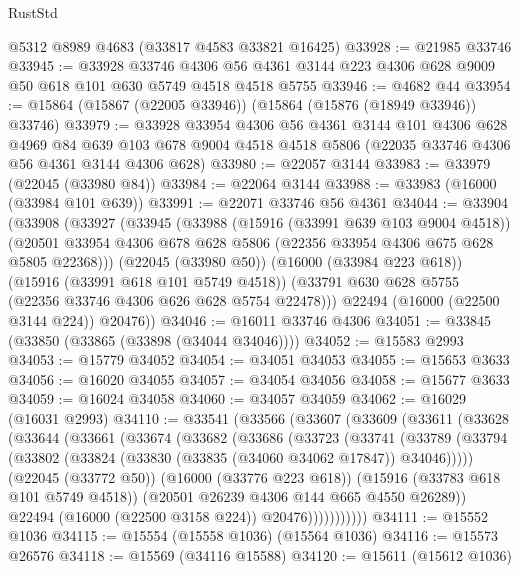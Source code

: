 \begin{lexlean}{RustStd}
\begin{coremodule}
    @5312
    @8989
    @4683
    (@33817 @4583 @33821 @16425)
@33928 := @21985 @33746
@33945 := @33928
    @33746
    @4306
    @56
    @4361
    @3144
    @223
    @4306
    @628
    @9009
    @50
    @618
    @101
    @630
    @5749
    @4518
    @4518
    @5755
@33946 := @4682 @44
@33954 := @15864 (@15867 (@22005 @33946)) (@15864 (@15876 (@18949 @33946)) @33746)
@33979 := @33928
    @33954
    @4306
    @56
    @4361
    @3144
    @101
    @4306
    @628
    @4969
    @84
    @639
    @103
    @678
    @9004
    @4518
    @4518
    @5806
    (@22035 @33746 @4306 @56 @4361 @3144 @4306 @628)
@33980 := @22057 @3144
@33983 := @33979 (@22045 (@33980 @84))
@33984 := @22064 @3144
@33988 := @33983 (@16000 (@33984 @101 @639))
@33991 := @22071 @33746 @56 @4361
@34044 := @33904
    (@33908
      (@33927
        (@33945
          (@33988
            (@15916 (@33991 @639 @103 @9004 @4518))
            (@20501 @33954 @4306 @678 @628 @5806 (@22356 @33954 @4306 @675 @628 @5805 @22368)))
          (@22045 (@33980 @50))
          (@16000 (@33984 @223 @618))
          (@15916 (@33991 @618 @101 @5749 @4518))
          (@33791 @630 @628 @5755 (@22356 @33746 @4306 @626 @628 @5754 @22478)))
        @22494
        (@16000 (@22500 @3144 @224))
        @20476))
@34046 := @16011 @33746 @4306
@34051 := @33845 (@33850 (@33865 (@33898 (@34044 @34046))))
@34052 := @15583 @2993
@34053 := @15779 @34052
@34054 := @34051 @34053
@34055 := @15653 @3633
@34056 := @16020 @34055
@34057 := @34054 @34056
@34058 := @15677 @3633
@34059 := @16024 @34058
@34060 := @34057 @34059
@34062 := @16029 (@16031 @2993)
@34110 := @33541
    (@33566
      (@33607
        (@33609
          (@33611
            (@33628
              (@33644
                (@33661
                  (@33674
                    (@33682
                      (@33686
                        (@33723
                          (@33741
                            (@33789
                              (@33794
                                (@33802 (@33824 (@33830 (@33835 (@34060 @34062 @17847)) @34046)))))
                            (@22045 (@33772 @50))
                            (@16000 (@33776 @223 @618))
                            (@15916 (@33783 @618 @101 @5749 @4518))
                            (@20501 @26239 @4306 @144 @665 @4550 @26289))
                          @22494
                          (@16000 (@22500 @3158 @224))
                          @20476)))))))))))
@34111 := @15552 @1036
@34115 := @15554 (@15558 @1036) (@15564 @1036)
@34116 := @15573 @26576
@34118 := @15569 (@34116 @15588)
@34120 := @15611 (@15612 @1036)

\end{coremodule}
\end{lexlean}
